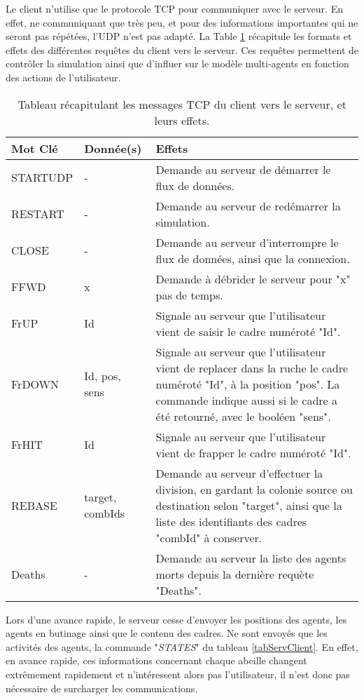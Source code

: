 	Le client n'utilise que le protocole TCP pour communiquer avec le serveur. En effet, ne communiquant que très peu, et pour des informations importantes qui ne seront pas répétées, l'UDP n'est pas adapté. La Table \ref{tabClientServ} récapitule les formats et effets des différentes requêtes du client vers le serveur. Ces requêtes permettent de contrôler la simulation ainsi que d'influer sur le modèle multi-agents en fonction des actions de l'utilisateur.
	
	
	\begin{table}
		\begin{tabularx}{\textwidth}{|l|l|X|}
		\hline
		\textbf{Mot Clé }& \textbf{Donnée(s)} & \textbf{Effets}\\
		\hline
		STARTUDP & - & Demande au serveur de démarrer le flux de données.\\
		\hline
		RESTART & - & Demande au serveur de redémarrer la simulation.\\
		\hline
		CLOSE & - & Demande au serveur d'interrompre le flux de données, ainsi que la connexion.\\
		\hline
		FFWD & x & Demande à débrider le serveur pour "x" pas de temps.\\
		\hline
		FrUP & Id & Signale au serveur que l'utilisateur vient de saisir le cadre numéroté "Id".\\
		\hline
		FrDOWN & Id, pos, sens & Signale au serveur que l'utilisateur vient de replacer dans la ruche le cadre numéroté "Id", à la position "pos". La commande indique aussi si le cadre a été retourné, avec le booléen "sens".\\
		\hline
		FrHIT & Id & Signale au serveur que l'utilisateur vient de frapper le cadre numéroté "Id".\\
		\hline
		REBASE & target, {combIds} & Demande au serveur d'effectuer la division, en gardant la colonie source ou destination selon "target", ainsi que la liste des identifiants des cadres "combId" à conserver.\\
		\hline
		Deaths & - & Demande au serveur la liste des agents morts depuis la dernière requète "Deaths".\\
		\hline
		\end{tabularx}
	\caption{Tableau récapitulant les messages TCP du client vers le serveur, et leurs effets.}
	\label{tabClientServ}
	\end{table}
	
	Lors d'une avance rapide, le serveur cesse d'envoyer les positions des agents, les agents en butinage ainsi que le contenu des cadres. Ne sont envoyés que les activités des agents, la commande "\textit{STATES}" du tableau \ref{tabServClient}. En effet, en avance rapide, ces informations concernant chaque abeille changent extrêmement rapidement et n'intéressent alors pas l'utilisateur, il n'est donc pas nécessaire de surcharger les communications.
	
